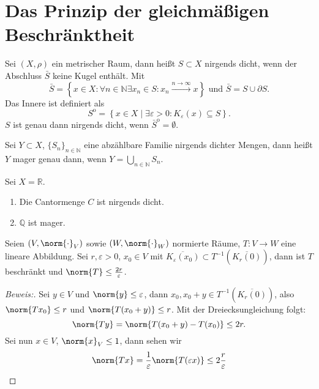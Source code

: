 \section{Das Prinzip der gleichmäßigen Beschränktheit}
\begin{definition}
	Sei $(X, \rho)$ ein metrischer Raum, dann heißt $S \subset X$ nirgends dicht, wenn der Abschluss $\bar{S}$ keine Kugel enthält. Mit 
	\[
	\bar{S} = \left\{ x \in X : \forall n \in \mathbb{N} \exists x_n \in S: x_n \xrightarrow{n \to \infty} x \right\} \text{ und } \bar{S} = S \cup \partial S.
	\] 
	Das Innere ist definiert als 
	\[
	S^{\mathrm{o}} = \left\{ x \in X \mid \exists \varepsilon > 0: K_{\varepsilon}(x) \subseteq S \right\}.
	\] 
	$S$ ist genau dann nirgends dicht, wenn $\bar{S}^{\mathrm{o}} = \emptyset$.
\end{definition}

\begin{definition}
	Sei $Y \subset X$, $\{S_n\}_{n \in \mathbb{N}}$ eine abzählbare Familie nirgends dichter Mengen, dann heißt $Y$ mager genau dann, wenn $Y = \bigcup_{n \in \mathbb{N}} S_n$.
\end{definition}

\begin{ex}
	Sei $X = \mathbb{R}$. 
	\begin{enumerate}
		\item Die Cantormenge $C$ ist nirgends dicht.
		\item $\mathbb{Q}$ ist mager.
	\end{enumerate}
\end{ex}

\begin{lemma} \label{lemma_glm_beschr}
	Seien $(V, \norm{\cdot}_V)$ sowie $(W, \norm{\cdot}_W)$ normierte Räume, $T: V \to W$ eine lineare Abbildung. Sei $r, \varepsilon > 0$, $x_0 \in V$ mit $\overline{K_{\varepsilon}(x_0)} \subset T^{-1}(\overline{K_r(0)})$, dann ist $T$ beschränkt und $\norm{T} \leq \frac{2r}{\varepsilon}$.
	
	\begin{proof}[Beweis:] 
		Sei $y \in V$ und $\norm{y} \leq \varepsilon$, dann $x_0, x_0 + y \in T^{-1}(\overline{K_r(0)})$, also $\norm{Tx_0} \leq r$ und $\norm{T(x_0 + y)} \leq r$. Mit der Dreiecksungleichung folgt: 
		\[
		\norm{Ty} = \norm{T(x_0 + y) - T(x_0)} \leq 2r.
		\] 
		Sei nun $x \in V$, $\norm{x}_V \leq 1$, dann sehen wir 
		\[
		\norm{Tx} = \frac{1}{\varepsilon} \norm{T(\varepsilon x)} \leq 2 \frac{r}{\varepsilon}
		\]
	\end{proof}
\end{lemma}

